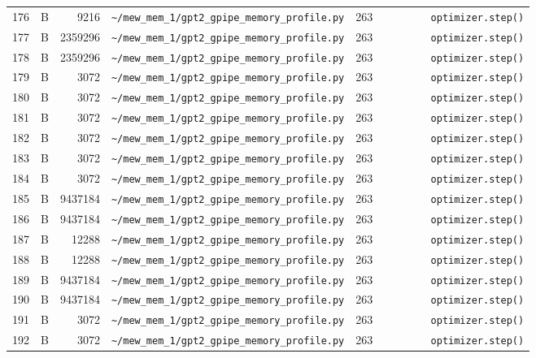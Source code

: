 \documentclass{article}
\begin{document}
\begin{longtable}{r l r p{6.5cm} r p{7.0cm}}
176 & B & 9216 & \lstinline|~/mew_mem_1/gpt2_gpipe_memory_profile.py| & 263 & \lstinline|        optimizer.step()| \\
177 & B & 2359296 & \lstinline|~/mew_mem_1/gpt2_gpipe_memory_profile.py| & 263 & \lstinline|        optimizer.step()| \\
178 & B & 2359296 & \lstinline|~/mew_mem_1/gpt2_gpipe_memory_profile.py| & 263 & \lstinline|        optimizer.step()| \\
179 & B & 3072 & \lstinline|~/mew_mem_1/gpt2_gpipe_memory_profile.py| & 263 & \lstinline|        optimizer.step()| \\
180 & B & 3072 & \lstinline|~/mew_mem_1/gpt2_gpipe_memory_profile.py| & 263 & \lstinline|        optimizer.step()| \\
181 & B & 3072 & \lstinline|~/mew_mem_1/gpt2_gpipe_memory_profile.py| & 263 & \lstinline|        optimizer.step()| \\
182 & B & 3072 & \lstinline|~/mew_mem_1/gpt2_gpipe_memory_profile.py| & 263 & \lstinline|        optimizer.step()| \\
183 & B & 3072 & \lstinline|~/mew_mem_1/gpt2_gpipe_memory_profile.py| & 263 & \lstinline|        optimizer.step()| \\
184 & B & 3072 & \lstinline|~/mew_mem_1/gpt2_gpipe_memory_profile.py| & 263 & \lstinline|        optimizer.step()| \\
185 & B & 9437184 & \lstinline|~/mew_mem_1/gpt2_gpipe_memory_profile.py| & 263 & \lstinline|        optimizer.step()| \\
186 & B & 9437184 & \lstinline|~/mew_mem_1/gpt2_gpipe_memory_profile.py| & 263 & \lstinline|        optimizer.step()| \\
187 & B & 12288 & \lstinline|~/mew_mem_1/gpt2_gpipe_memory_profile.py| & 263 & \lstinline|        optimizer.step()| \\
188 & B & 12288 & \lstinline|~/mew_mem_1/gpt2_gpipe_memory_profile.py| & 263 & \lstinline|        optimizer.step()| \\
189 & B & 9437184 & \lstinline|~/mew_mem_1/gpt2_gpipe_memory_profile.py| & 263 & \lstinline|        optimizer.step()| \\
190 & B & 9437184 & \lstinline|~/mew_mem_1/gpt2_gpipe_memory_profile.py| & 263 & \lstinline|        optimizer.step()| \\
191 & B & 3072 & \lstinline|~/mew_mem_1/gpt2_gpipe_memory_profile.py| & 263 & \lstinline|        optimizer.step()| \\
192 & B & 3072 & \lstinline|~/mew_mem_1/gpt2_gpipe_memory_profile.py| & 263 & \lstinline|        optimizer.step()| \\

\end{longtable}
\end{document}
